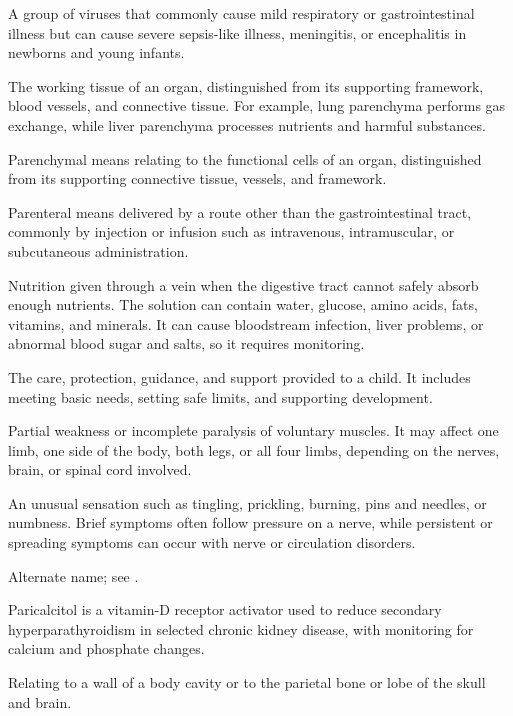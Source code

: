 A group of viruses that commonly cause mild respiratory or gastrointestinal illness but can cause severe sepsis-like illness, meningitis, or encephalitis in newborns and young infants.

 The working tissue of an organ, distinguished from its supporting framework, blood vessels, and connective tissue. For example, lung parenchyma performs gas exchange, while liver parenchyma processes nutrients and harmful substances.

 Parenchymal means relating to the functional cells of an organ, distinguished from its supporting connective tissue, vessels, and framework.

 Parenteral means delivered by a route other than the gastrointestinal tract, commonly by injection or infusion such as intravenous, intramuscular, or subcutaneous administration.

 Nutrition given through a vein when the digestive tract cannot safely absorb enough nutrients. The solution can contain water, glucose, amino acids, fats, vitamins, and minerals. It can cause bloodstream infection, liver problems, or abnormal blood sugar and salts, so it requires monitoring.

 The care, protection, guidance, and support provided to a child. It includes meeting basic needs, setting safe limits, and supporting development.

 Partial weakness or incomplete paralysis of voluntary muscles. It may affect one limb, one side of the body, both legs, or all four limbs, depending on the nerves, brain, or spinal cord involved.

 An unusual sensation such as tingling, prickling, burning, pins and needles, or numbness. Brief symptoms often follow pressure on a nerve, while persistent or spreading symptoms can occur with nerve or circulation disorders.

 Alternate name; see .

 Paricalcitol is a vitamin-D receptor activator used to reduce secondary hyperparathyroidism in selected chronic kidney disease, with monitoring for calcium and phosphate changes.

 Relating to a wall of a body cavity or to the parietal bone or lobe of the skull and brain.

